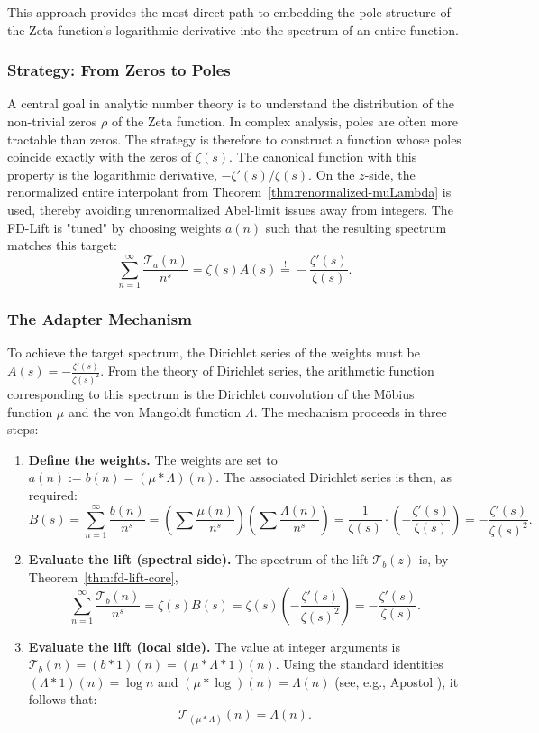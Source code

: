 \documentclass[11pt,a4paper]{amsart}
\theoremstyle{plain}
\theoremstyle{definition}
\theoremstyle{remark}
\begin{document}
This approach provides the most direct path to embedding the pole structure of the Zeta function's logarithmic derivative into the spectrum of an entire function.

\subsubsection{Strategy: From Zeros to Poles}
A central goal in analytic number theory is to understand the distribution of the non-trivial zeros $\rho$ of the Zeta function. In complex analysis, poles are often more tractable than zeros. The strategy is therefore to construct a function whose poles coincide exactly with the zeros of $\zeta(s)$. The canonical function with this property is the logarithmic derivative, $-\zeta'(s)/\zeta(s)$. On the $z$-side, the renormalized entire interpolant from Theorem~\ref{thm:renormalized-muLambda} is used, thereby avoiding unrenormalized Abel-limit issues away from integers.
The FD-Lift is "tuned" by choosing weights $a(n)$ such that the resulting spectrum matches this target:
\[
\sum_{n=1}^{\infty}\frac{\mathcal T_a(n)}{n^s} = \zeta(s) A(s) \stackrel{!}{=} -\frac{\zeta'(s)}{\zeta(s)}.
\]

\subsubsection{The Adapter Mechanism}
To achieve the target spectrum, the Dirichlet series of the weights must be $A(s) = -\frac{\zeta'(s)}{\zeta(s)^2}$. From the theory of Dirichlet series, the arithmetic function corresponding to this spectrum is the Dirichlet convolution of the M\"obius function $\mu$ and the von Mangoldt function $\Lambda$. The mechanism proceeds in three steps:
\begin{enumerate}
    \item \textbf{Define the weights.} The weights are set to $a(n) := b(n) = (\mu * \Lambda)(n)$. The associated Dirichlet series is then, as required:
    \[
    B(s) = \sum_{n=1}^{\infty}\frac{b(n)}{n^s} = \left(\sum\frac{\mu(n)}{n^s}\right)\left(\sum\frac{\Lambda(n)}{n^s}\right) = \frac{1}{\zeta(s)}\cdot\left(-\frac{\zeta'(s)}{\zeta(s)}\right) = -\frac{\zeta'(s)}{\zeta(s)^2}.
    \]
    \item \textbf{Evaluate the lift (spectral side).} The spectrum of the lift $\mathcal{T}_b(z)$ is, by Theorem~\ref{thm:fd-lift-core},
    \[
    \sum_{n=1}^{\infty}\frac{\mathcal T_b(n)}{n^s} = \zeta(s)B(s) = \zeta(s) \left(-\frac{\zeta'(s)}{\zeta(s)^2}\right) = -\frac{\zeta'(s)}{\zeta(s)}.
    \]
    \item \textbf{Evaluate the lift (local side).} The value at integer arguments is $\mathcal{T}_b(n)=(b*1)(n) = (\mu * \Lambda * 1)(n)$. Using the standard identities $(\Lambda*1)(n)=\log n$ and $(\mu*\log)(n)=\Lambda(n)$ (see, e.g., Apostol \cite[Ch.~2]{apostol1976}), it follows that:
    \[
    \mathcal{T}_{(\mu*\Lambda)}(n) = \Lambda(n).
    \]
\end{enumerate}
\end{document}
